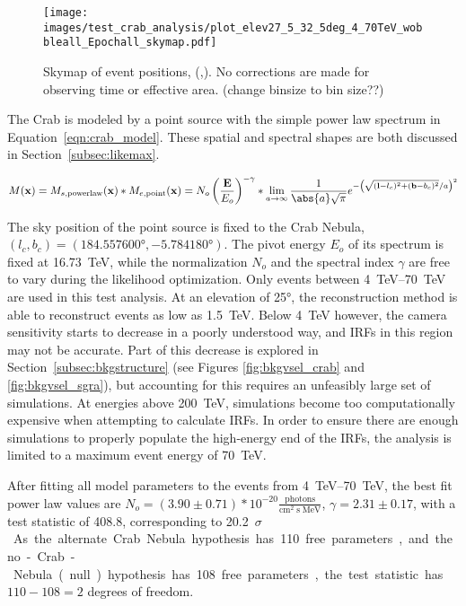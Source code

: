   \begin{figure}[h]
    \centering
    \texttt{[image: images/test\_crab\_analysis/plot\_elev27\_5\_32\_5deg\_4\_70TeV\_wobbleall\_Epochall\_skymap.pdf]}
    \caption[Crab Counts Skymap]
    {
      Skymap of event positions, (\ldet,\bdet).
      No corrections are made for observing time or effective area.
      {\color{red}(change binsize to bin size??)}
    }
    \label{fig:crab_skymap}
  \end{figure}
  
  The Crab is modeled by a point source with the simple power law spectrum in Equation~\ref{eqn:crab_model}.
  These spatial and spectral shapes are both discussed in Section~\ref{subsec:likemax}.

  \begin{equation}\label{eqn:crab_model}
    M(\xtrue) = M_{s,\textrm{powerlaw}}(\xtrue) * M_{e,\textrm{point}}(\xtrue) = N_o \left ( \frac{\Etrue}{E_o} \right )^{-\gamma} * \lim_{a\to\infty} \frac{1}{ \abs{a} \sqrt{\pi} } e^{ - \left ( \sqrt{ (\ltrue-l_c)^2 + (\btrue-b_c)^2 }/a \right )^2 }
  \end{equation}

  The sky position of the point source is fixed to the Crab Nebula, $(l_c,b_c) = (\ang{184.557600},\ang{-5.784180})$.
  The pivot energy $E_o$ of its spectrum is fixed at \SI{16.73}{TeV}, while the normalization $N_o$ and the spectral index $\gamma$ are free to vary during the likelihood optimization.
  Only events between \SIrange{4}{70}{TeV} are used in this test analysis.
  At an elevation of \ang{25}, the reconstruction method is able to reconstruct events as low as \SI{1.5}{TeV}.
  Below \SI{4}{TeV} however, the camera sensitivity starts to decrease in a poorly understood way, and IRFs in this region may not be accurate.
  Part of this decrease is explored in Section~\ref{subsec:bkgstructure} (see Figures \ref{fig:bkgvsel_crab} and \ref{fig:bkgvsel_sgra}), but accounting for this requires an unfeasibly large set of simulations.
  At energies above \SI{200}{TeV}, simulations become too computationally expensive when attempting to calculate IRFs.
  In order to ensure there are enough simulations to properly populate the high-energy end of the IRFs, the analysis is limited to a maximum event energy of \SI{70}{TeV}.
    
  After fitting all model parameters to the events from \SIrange{4}{70}{TeV}, the best fit power law values are $ N_o = \left(3.90\pm0.71\right)*10^{-20} \frac{\textrm{photons}}{\textrm{cm}^{2} \; \textrm{s} \; \textrm{MeV} } $, $ \gamma = 2.31 \pm 0.17 $, with a test statistic of 408.8, corresponding to \nicetilde{}\SI{20.2}{$\sigma$}.
  As the alternate Crab Nebula hypothesis has 110 free parameters, and the no-Crab-Nebula (null) hypothesis has 108 free parameters, the test statistic has $ 110 - 108 = 2 $ degrees of freedom.
  
